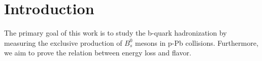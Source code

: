 \chapter*{Introduction}
\label{chap:Introduction}
The primary goal of this work is to study the b-quark hadronization by measuring the exclusive production of $B_s^0$ mesons in p-Pb collisions. Furthermore, we aim to prove the relation between energy loss and flavor.